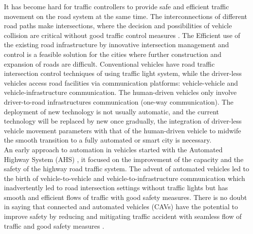 \documentclass{book}
\begin{document}
 It has become hard for traffic  controllers to provide safe and efficient traffic movement on the road system at the same time. The interconnections of different road paths make intersections, where the decision and possibilities of vehicle collision are critical without good traffic control measures \cite{ferreira2015methods,feng2015real}. The Efficient use of the existing road infrastructure by innovative intersection management and control is a feasible solution for the cities where further construction and expansion of roads are difficult. Conventional vehicles have   road traffic intersection control techniques of using traffic light system, while the driver-less vehicles access road facilities via communication platforms: vehicle-vehicle and vehicle-infrastructure communication. The human-driven vehicles only involve driver-to-road infrastructures communication (one-way communication). The deployment of new technology is not usually automatic, and the current technology will be replaced by new once gradually, the integration of driver-less vehicle movement parameters with that of the human-driven vehicle to midwife the smooth transition to a fully automated or smart city is necessary.\\
An early approach to automation in vehicles started with the Automated Highway System (AHS) \cite{horowitz2000control, horowitz2000control,lu2004automated, vial2016scheduling, annell2016probabilistic}, it focused on the improvement of the capacity and the safety of the highway road traffic system. The advent of automated vehicles led to the birth of vehicle-to-vehicle and vehicle-to-infrastructure communication which inadvertently led to road intersection settings without traffic lights but has smooth and efficient flows of traffic with good safety measures. There is no doubt in saying that connected and automated vehicles (CAVs) have the potential to improve safety by reducing and mitigating traffic accident with seamless flow of traffic and good safety measures \cite{schrank2012tti, rios2017survey, lin2019autonomous, abduljabbar2019applications}.\\

\end{document}

